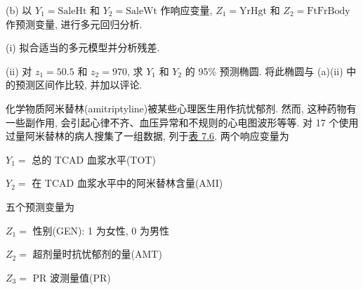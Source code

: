 \noindent (b) 以 $Y_1=\mathrm{SaleHt}$ 和 $Y_2=\mathrm{SaleWt}$ 作响应变量, $Z_1=\mathrm{YrHgt}$ 和 $Z_2=\mathrm{FtFrBody}$ 作预测变量, 进行多元回归分析.

\noindent (i) 拟合适当的多元模型并分析残差.

\noindent (ii) 对 $z_1=50.5$ 和 $z_2=970$, 求 $Y_1$ 和 $Y_2$ 的 95\% 预测椭圆. 将此椭圆与 (a)(ii) 中的预测区间作比较, 并加以评论.

\medskip
{}\quad 化学物质阿米替林(amitriptyline)被某些心理医生用作抗忧郁剂. 然而, 这种药物有一些副作用, 会引起心律不齐、血压异常和不规则的心电图波形等等. 对 17 个使用过量阿米替林的病人搜集了一组数据, 列于\hyperref[tab:7.6]{表 7.6}. 两个响应变量为

\noindent $Y_1=$ 总的 TCAD 血浆水平(TOT)

\noindent $Y_2=$ 在 TCAD 血浆水平中的阿米替林含量(AMI)

\noindent 五个预测变量为

\noindent $Z_1=$ 性别(GEN): 1 为女性, 0 为男性

\noindent $Z_2=$ 超剂量时抗忧郁剂的量(AMT)

\noindent $Z_3=$ PR 波测量值(PR)
